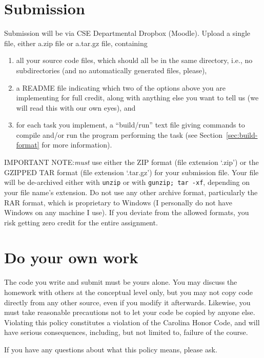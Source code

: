 \documentclass[11pt]{article}
\begin{document}
\section{Submission}

Submission will be via CSE Departmental Dropbox (Moodle).  Upload a
single file, either a.zip file or a.tar.gz file, containing

\begin{enumerate}
  \item
    all your source code files, which should all be in the same
    directory, i.e., no subdirectories (and no automatically generated
    files, please),
  \item
    a README file indicating which two of the options above you are
    implementing for full credit, along with anything else you want to
    tell us (we will read this with our own eyes), and
  \item
    for each task you implement, a ``build/run'' text file giving
    commands to compile and/or run the program performing the task
    (see Section~\ref{sec:build-format} for more information).
\end{enumerate}


IMPORTANT NOTE:\@You \emph{must} use either the ZIP format (file
extension `.zip') or the GZIPPED TAR format (file extension `.tar.gz')
for your submission file.  Your file will be de-archived either with
\texttt{unzip} or with \texttt{gunzip; tar -xf}, depending on your
file name's extension.  Do not use any other archive format,
particularly the RAR format, which is proprietary to Windows (I
personally do not have Windows on any machine I use).  If you deviate
from the allowed formats, you risk getting zero credit for the entire
assignment.

\section{Do your own work}

The code you write and submit must be yours alone.  You may discuss
the homework with others at the conceptual level only, but you may not
copy code directly from any other source, even if you modify it
afterwards.  Likewise, you must take reasonable precautions not to let
your code be copied by anyone else.  Violating this policy constitutes
a violation of the Carolina Honor Code, and will have serious
consequences, including, but not limited to, failure of the course.

If you have any questions about what this policy means, please ask.
\end{document}
